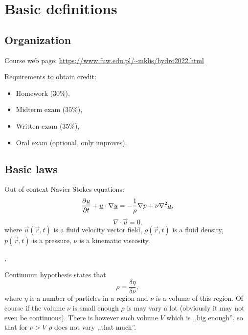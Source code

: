 \documentclass[../main.tex]{subfiles}
\begin{document}
  \chapter{Basic definitions}


    \section{Organization}
    Course web page: \url{https://www.fuw.edu.pl/~mklis/hydro2022.html}
    

    Requirements to obtain credit:
    \begin{itemize}
      \item Homework ($30\%$),
      \item Midterm exam ($35\%$),
      \item Written exam ($35\%$),
      \item Oral exam (optional, only improves).
    \end{itemize}


    \section{Basic laws}

    \begin{example}
      Out of context Navier-Stokes equations:
      \begin{displaymath}
        \frac{\partial \underline{u}}{\partial t} + \underline{u} \cdot \nabla \underline{u} = - \frac{1}{\rho} \nabla p + \nu\nabla^2 \underline{u},
      \end{displaymath}
      \begin{displaymath}
        \nabla \cdot \vec u = 0.
      \end{displaymath}
      where $\vec u(\vec r,t)$ is a fluid velocity vector field, $\rho(\vec r,t)$ is a fluid density, 
      $p(\vec r, t)$ is a pressure, $\nu$ is a kinematic viscosity.
    \end{example}

    \sep


    Continuum hypothesis states that
    \begin{displaymath}
      \rho = \frac{\delta\eta}{\delta \nu},
    \end{displaymath}
    where $\eta$ is a number of particles in a region and $\nu$ is a volume of this region.
    Of course if the volume $\nu$ is small enough $\rho$ is may vary a lot (obviously it may not even be continuous).
    There is however such volume $V$ which is ,,big enough'', so that for $\nu > V$ $\rho$ does not vary ,,that much''.
\end{document}
